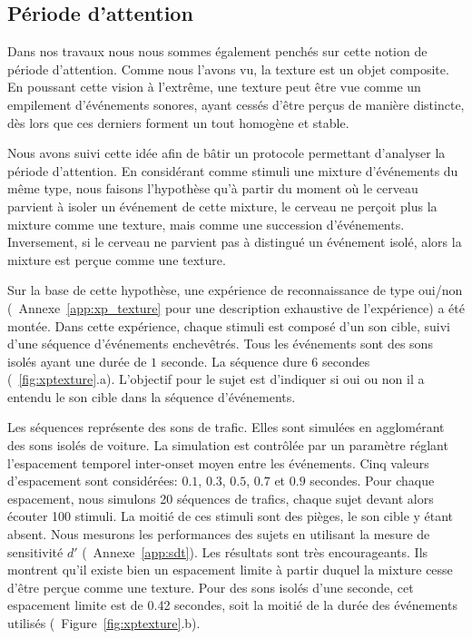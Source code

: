 \subsection{Période d'attention}

Dans nos travaux nous nous sommes également penchés sur cette notion de période d'attention. Comme nous l'avons vu, la texture est un objet composite. En poussant cette vision à l’extrême, une texture peut être vue comme un empilement d’événements sonores, ayant cessés d'être perçus de manière distincte, dès lors que ces derniers forment un tout homogène et stable. 

Nous avons suivi cette idée afin de bâtir un protocole permettant d'analyser la période d'attention. En considérant comme stimuli une mixture d'événements du même type, nous faisons l'hypothèse qu'à partir du moment où le cerveau parvient à isoler un événement de cette mixture, le cerveau ne perçoit plus la mixture comme une texture, mais comme une succession d'événements. Inversement, si le cerveau ne parvient pas à distingué un événement isolé, alors la mixture est perçue comme une texture.

Sur la base de cette hypothèse, une expérience de reconnaissance de type oui/non (\Cf~Annexe~\ref{app:xp_texture} pour une description exhaustive de l'expérience) a été montée. Dans cette expérience, chaque stimuli est composé d'un son cible, suivi d'une séquence d'événements enchevêtrés. Tous les événements sont des sons isolés ayant une durée de $1$ seconde. La séquence dure 6 secondes (\Cf~\ref{fig:xptexture}.a). L'objectif pour le sujet est d'indiquer si oui ou non il a entendu le son cible dans la séquence d’événements.

Les séquences représente des sons de trafic. Elles sont simulées en agglomérant des sons isolés de voiture. La simulation est contrôlée par un paramètre réglant l'espacement temporel inter-onset moyen entre les événements. Cinq valeurs d'espacement sont considérées: $0.1$, $0.3$, $0.5$, $0.7$ et $0.9$ secondes. Pour chaque espacement, nous simulons 20 séquences de trafics, chaque sujet devant alors écouter 100 stimuli. La moitié de ces stimuli sont des pièges, le son cible y étant absent. Nous mesurons les performances des sujets en utilisant la mesure de sensitivité $d'$ (\Cf~Annexe~\ref{app:sdt}). Les résultats sont très encourageants. Ils montrent qu'il existe bien un espacement limite à partir duquel la mixture cesse d'être perçue comme une texture. Pour des sons isolés d'une seconde, cet espacement limite est de 0.42 secondes, soit la moitié de la durée des événements utilisés (\Cf~Figure~\ref{fig:xptexture}.b).

